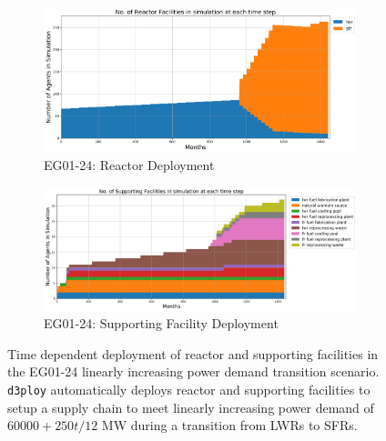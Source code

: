 \documentclass[11pt]{article}
\newcommand{\deploy}{\texttt{d3ploy}\xspace}%
\begin{document}
\begin{figure}[]
	\centering
	\begin{subfigure}[t]{1.2\textwidth}
		\centering
		\includegraphics[width=\linewidth]{24-figures/eg24-stack_reactor.png} 
		\caption{EG01-24: Reactor Deployment}
		\label{fig:24reactor}
	\end{subfigure}
	\vspace{1cm}
	\begin{subfigure}[t]{1.2\textwidth}
		\centering
		\includegraphics[width=\linewidth]{24-figures/eg24-stack_support.png} 
		\caption{EG01-24: Supporting Facility Deployment}
		\label{fig:24support}
	\end{subfigure}
	\hfill
	\caption{Time dependent deployment of reactor and supporting facilities in 
	the EG01-24 linearly increasing power demand transition scenario. 
	\deploy automatically deploys reactor and supporting facilities 
	to setup a supply chain to meet linearly increasing power demand of $60000 + 250t/12$ MW
	during a transition from \glspl{LWR} to \glspl{SFR}. }
	\label{fig:24stack}
\end{figure}
\end{document}
